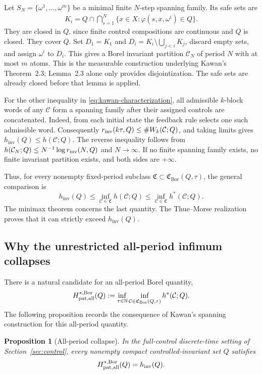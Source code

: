\documentclass[11pt,reqno]{amsart}
\numberwithin{equation}{section}
\newtheorem{proposition}[theorem]{Proposition}
\theoremstyle{definition}
\newcommand{\N}{\mathbb N}
\newcommand{\C}{\mathcal C}
\newcommand{\hpat}{h^{*}}
\newcommand{\hinv}{h_{\mathrm{inv}}}
\newcommand{\Bor}{\mathrm{Bor}}
\begin{document}
Let $S_N=\{\omega^1,\ldots,\omega^m\}$ be a minimal finite
$N$-step spanning family. Its safe sets are
\begin{align*}
 K_i=Q\cap\bigcap_{s=1}^{N}
       \{x\in X:\varphi(s,x,\omega^i)\in Q\}.
\end{align*}
They are closed in $Q$, since finite control compositions are continuous
and $Q$ is closed. They cover $Q$. Set
$D_1=K_1$ and $D_i=K_i\setminus\bigcup_{j<i}K_j$, discard empty sets,
and assign $\omega^i$ to $D_i$. This gives a Borel invariant partition
$\C_N$ of period $N$ with at most $m$ atoms. This is the measurable
construction underlying Kawan's Theorem~2.3; Lemma~2.3 alone only
provides disjointization. The safe sets are already closed before
that lemma is applied.

For the other inequality in \eqref{eq:kawan-characterization}, all
admissible $k$-block words of any $\C$ form a spanning family after their
assigned controls are concatenated. Indeed, from each initial state the
feedback rule selects one such admissible word. Consequently
$r_{\rm inv}(k\tau,Q)\le\#W_k(\C;Q)$, and taking limits gives
$\hinv(Q)\le h(\C;Q)$. The reverse inequality follows from
$h(\C_N;Q)\le N^{-1}\log r_{\rm inv}(N,Q)$ and $N\to\infty$.
If no finite spanning family exists, no finite invariant partition exists,
and both sides are $+\infty$.

Thus, for every nonempty fixed-period subclass
$\mathfrak C\subset\mathfrak C_{\Bor}(Q,\tau)$, the general comparison is
\begin{equation}\label{eq:three-quantities}
 \hinv(Q)
 \le\inf_{\C\in\mathfrak C}h(\C;Q)
 \le\inf_{\C\in\mathfrak C}\hpat(\C;Q).
\end{equation}
The minimax theorem concerns the last quantity. The Thue--Morse
realization proves that it can strictly exceed $\hinv(Q)$.

\subsection{Why the unrestricted all-period infimum collapses}
There is a natural candidate for an all-period Borel quantity,
\begin{align*}
 H_{\rm pat,all}^{*,\Bor}(Q)
 :=\inf_{\tau\in\N}\inf_{\C\in\mathfrak C_{\Bor}(Q,\tau)}
       \hpat(\C;Q).
\end{align*}
The following proposition records the consequence of Kawan's spanning
construction for this all-period quantity.

\begin{proposition}[All-period collapse]\label{prop:all-period-collapse}
In the full-control discrete-time setting of Section~\ref{sec:control}, every
nonempty compact controlled-invariant set $Q$ satisfies
\begin{equation}\label{eq:all-period-collapse}
 H_{\rm pat,all}^{*,\Bor}(Q)=\hinv(Q).
\end{equation}
\end{proposition}
\end{document}
